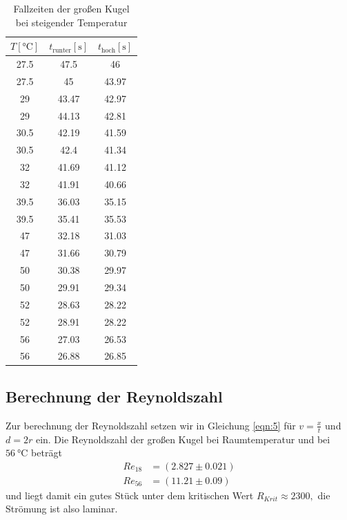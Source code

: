 \begin{table}[!htp]
  \centering
  \begin{tabular}{c|c|c}
    \toprule
    $T [\unit{\degreeCelsius}]$ & $t_{\text{runter}} [\unit{\second}]$ & $t_{\text{hoch}} [\unit{\second}]$\\
    \midrule
    27.5 & 47.5 & 46\\%
    27.5 & 45 & 43.97\\
    29 & 43.47 & 42.97\\
    29 & 44.13 & 42.81\\
    30.5 & 42.19 & 41.59\\
    30.5 & 42.4 & 41.34\\
    32 & 41.69 & 41.12\\
    32 & 41.91 & 40.66\\
    39.5 & 36.03 & 35.15\\
    39.5 & 35.41 & 35.53\\
    47 & 32.18 & 31.03\\
    47 & 31.66 & 30.79\\
    50 & 30.38 & 29.97\\
    50 & 29.91 & 29.34\\
    52 & 28.63 & 28.22\\
    52 & 28.91 & 28.22\\
    56 & 27.03 & 26.53\\
    56 & 26.88 & 26.85\\
    \bottomrule
  \end{tabular}
  \label{tabellegkt}
  \caption{Fallzeiten der großen Kugel bei steigender Temperatur}
\end{table}
\newpage

\subsection{Berechnung der Reynoldszahl}
Zur berechnung der Reynoldszahl setzen wir in Gleichung \eqref{eqn:5} für $v = \frac{x}{t}$ \: und \: $d = 2r$ ein.
Die Reynoldszahl der großen Kugel bei Raumtemperatur und bei $\SI{56}{\degreeCelsius}$ beträgt
\begin{align}
  Re_{18} &= (2.827 \pm 0.021)\\
  Re_{56} &= (11.21 \pm 0.09)
\end{align} und liegt damit ein gutes Stück unter dem kritischen Wert $R_{Krit} \approx 2300 ,$
die Strömung ist also laminar.\\

\newpage
